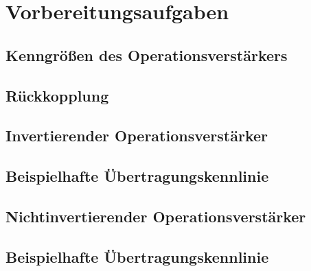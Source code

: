 \documentclass[a4paper, 12pt]{article}
\begin{document}
  
  \clearpage
  \setcounter{page}{1}

\section{Vorbereitungsaufgaben}

\subsection{Kenngrößen des Operationsverstärkers}


\subsection{Rückkopplung}


\subsection{Invertierender Operationsverstärker}


\subsection{Beispielhafte Übertragungskennlinie}


\subsection{Nichtinvertierender Operationsverstärker}


\subsection{Beispielhafte Übertragungskennlinie}

\end{document}
